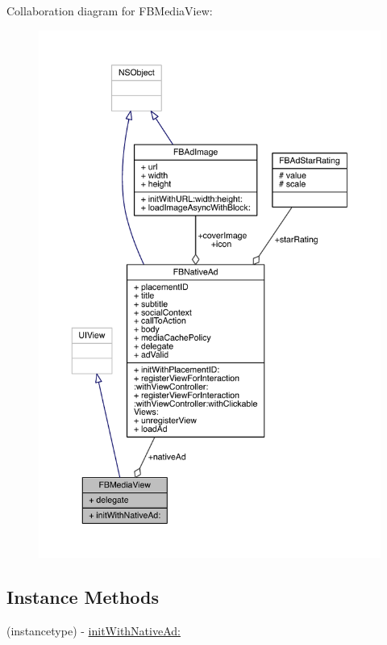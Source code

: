 Collaboration diagram for F\-B\-Media\-View\-:
\nopagebreak
\begin{figure}[H]
\begin{center}
\leavevmode
\includegraphics[width=350pt]{interface_f_b_media_view__coll__graph}
\end{center}
\end{figure}
\subsection*{Instance Methods}
\begin{DoxyCompactItemize}
\item 
(instancetype) -\/ \hyperlink{interface_f_b_media_view_a388192a358a23b10cca2c82fd82ebd3d}{init\-With\-Native\-Ad\-:}
\end{DoxyCompactItemize}

